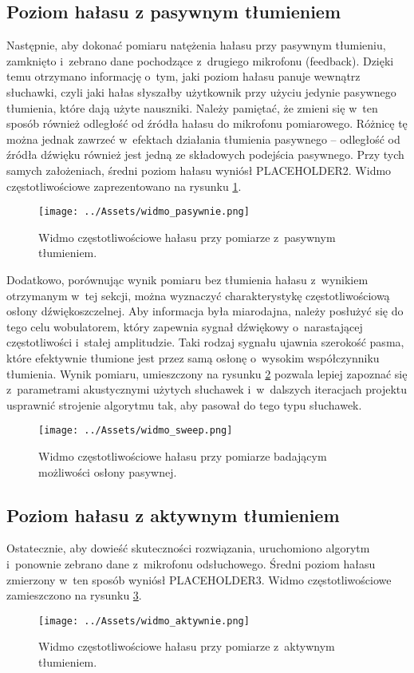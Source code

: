 \subsection{Poziom hałasu z pasywnym tłumieniem}
Następnie, aby dokonać pomiaru natężenia hałasu przy pasywnym tłumieniu, zamknięto i~zebrano dane pochodzące z~drugiego mikrofonu (feedback). Dzięki temu otrzymano informację o~tym, jaki poziom hałasu panuje wewnątrz słuchawki, czyli jaki hałas słyszałby użytkownik przy użyciu jedynie pasywnego tłumienia, które dają użyte nauszniki. Należy pamiętać, że zmieni się w~ten sposób również odległość od źródła hałasu do mikrofonu pomiarowego. Różnicę tę można jednak zawrzeć w~efektach działania tłumienia pasywnego -- odległość od źródła dźwięku również jest jedną ze składowych podejścia pasywnego. Przy tych samych założeniach, średni poziom hałasu wyniósł PLACEHOLDER2. %
Widmo częstotliwościowe zaprezentowano na rysunku \ref{fig:widmo_pasywnie}. 
\begin{figure}[h!]
	\centering
	\texttt{[image: ../Assets/widmo\_pasywnie.png]}	
	\caption{Widmo częstotliwościowe hałasu przy pomiarze z~pasywnym tłumieniem.}
	\label{fig:widmo_pasywnie}
\end{figure}

Dodatkowo, porównując wynik pomiaru bez tłumienia hałasu z~wynikiem otrzymanym w~tej sekcji, można wyznaczyć charakterystykę częstotliwościową osłony dźwiękoszczelnej. Aby informacja była miarodajna, należy posłużyć się do tego celu wobulatorem, który zapewnia sygnał dźwiękowy o~narastającej częstotliwości i~stałej amplitudzie. Taki rodzaj sygnału ujawnia szerokość pasma, które efektywnie tłumione jest przez samą osłonę o~wysokim współczynniku tłumienia. Wynik pomiaru, umieszczony na rysunku \ref{fig:sweep} pozwala lepiej zapoznać się z~parametrami akustycznymi użytych słuchawek i~w~dalszych iteracjach projektu usprawnić strojenie algorytmu tak, aby pasował do tego typu słuchawek.
\begin{figure}[h!]
	\centering
	\texttt{[image: ../Assets/widmo\_sweep.png]}	
	\caption{Widmo częstotliwościowe hałasu przy pomiarze badającym możliwości osłony pasywnej.}
	\label{fig:sweep}
\end{figure}
\subsection{Poziom hałasu z aktywnym tłumieniem}
Ostatecznie, aby dowieść skuteczności rozwiązania, uruchomiono algorytm i~ponownie zebrano dane z~mikrofonu odsłuchowego. Średni poziom hałasu zmierzony w~ten sposób wyniósł PLACEHOLDER3. %
Widmo częstotliwościowe zamieszczono na rysunku \ref{fig:widmo_aktywnie}.
\begin{figure}[h!]
	\centering
	\texttt{[image: ../Assets/widmo\_aktywnie.png]}	
	\caption{Widmo częstotliwościowe hałasu przy pomiarze z~aktywnym tłumieniem.}
	\label{fig:widmo_aktywnie}
\end{figure}

